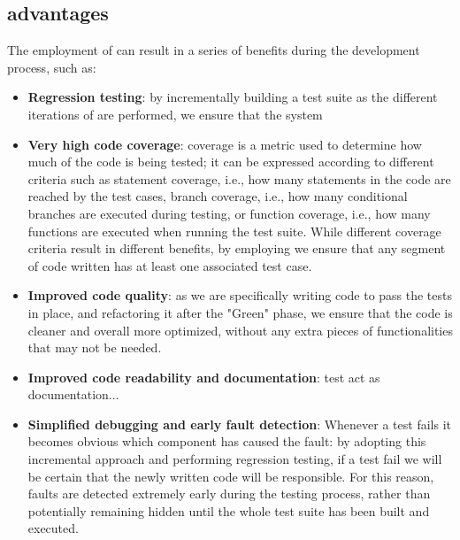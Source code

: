 \subsection{\tdd advantages}
The employment of \tdd can result in a series of benefits during the development process, such as:
\begin{itemize}
    \item \textbf{Regression testing}: by incrementally building a test suite as the different iterations of \tdd are performed, we ensure that the system  
    \item \textbf{Very high code coverage}: coverage is a metric used to determine how much of the code is being tested; it can be expressed according to different criteria such as statement coverage, i.e., how many statements in the code are reached by the test cases, branch coverage, i.e., how many conditional branches are executed during testing, or function coverage, i.e., how many functions are executed when running the test suite. While different coverage criteria result in different benefits, by employing \tdd we ensure that any segment of code written has at least one associated test case.
    \item \textbf{Improved code quality}: as we are specifically writing code to pass the tests in place, and refactoring it after the "Green" phase, we ensure that the code is cleaner and overall more optimized, without any extra pieces of functionalities that may not be needed. 
    \item \textbf{Improved code readability and documentation}: test act as documentation...
    \item \textbf{Simplified debugging and early fault detection}: Whenever a test fails it becomes obvious which component has caused the fault: by adopting this incremental approach and performing regression testing, if a test fail we will be certain that the newly written code will be responsible. For this reason, faults are detected extremely early during the testing process, rather than potentially remaining hidden until the whole test suite has been built and executed.
\end{itemize}


